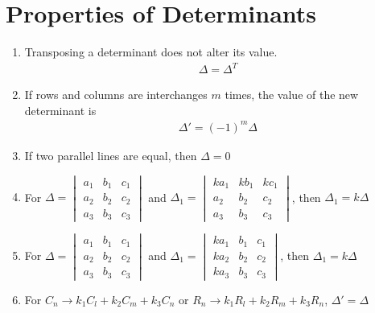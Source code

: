 \documentclass[../main.tex]{subfiles}
\begin{document}
	\section{Properties of Determinants}
	\begin{enumerate}
		\item Transposing a determinant does not alter its value.
			\begin{align}
				\Delta = \Delta^T
			\end{align}
		
		\item If rows and columns are interchanges $m$ times, the value of the new determinant is
			\begin{align}
				\Delta'=(-1)^m \Delta
			\end{align}
		
		\item If two parallel lines are equal, then $\Delta=0$
		
		\item For $\Delta=\begin{vmatrix}a_1&b_1&c_1\\a_2&b_2&c_2\\a_3&b_3&c_3\end{vmatrix}$ and $\Delta_1=\begin{vmatrix}ka_1&kb_1&kc_1\\a_2&b_2&c_2\\a_3&b_3&c_3\end{vmatrix}$, then $\Delta_1=k\Delta$
		
		\item For $\Delta=\begin{vmatrix}a_1&b_1&c_1\\a_2&b_2&c_2\\a_3&b_3&c_3\end{vmatrix}$ and $\Delta_1=\begin{vmatrix}ka_1&b_1&c_1\\ka_2&b_2&c_2\\ka_3&b_3&c_3\end{vmatrix}$, then $\Delta_1=k\Delta$
		
		\item For $C_n\rightarrow k_1C_l+k_2C_m+k_3C_n$ or $R_n\rightarrow k_1R_l+k_2R_m+k_3R_n$, $\Delta'=\Delta$
	\end{enumerate}
	
\end{document}
